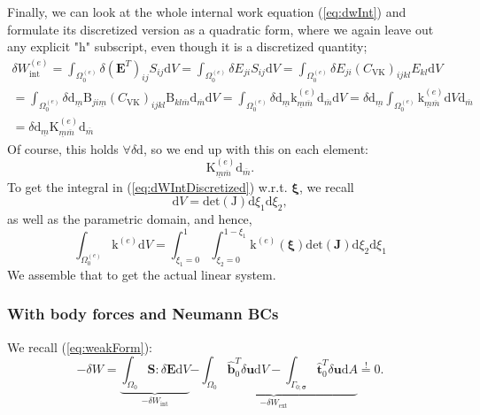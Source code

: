\documentclass[12pt,a4paper]{article}
\theoremstyle{remark} %
\newcommand{\bu}[1]{\bm{\mathrm #1}} %
\numberwithin{equation}{section} %
\begin{document}
Finally, we can look at the whole internal work equation (\ref{eq:dwInt}) and formulate its discretized version as a quadratic form, where we again leave out any explicit "h" subscript, even though it is a discretized quantity;
\begin{align} \label{eq:dWIntDiscretized}
	\delta W_{\text{int}}^{(e)} = \int_{\Omega_0^{(e)}} \delta (\bm E^T)_{ij} S_{ij} \mathrm d V
	= \int_{\Omega_0^{(e)}} \delta E_{ji} S_{ij} \mathrm d V
	= \int_{\Omega_0^{(e)}} \delta E_{ji} (C_{\text{VK}})_{ijkl} E_{kl} \mathrm d V \nonumber \\
	= \int_{\Omega_0^{(e)}} \delta \mathrm d_{\underline m} \mathrm B_{ji \underline m} (C_{\text{VK}})_{ijkl} \mathrm B_{kl \overline m} \mathrm d_{\overline m} \mathrm d V
	= \int_{\Omega_0^{(e)}} \delta \mathrm d_{\underline m} \mathrm k^{(e)}_{\underline m \overline m} \mathrm d_{\overline m} \mathrm d V
	= \delta \mathrm d_{\underline m} \int_{\Omega_0^{(e)}} \mathrm k^{(e)}_{\underline m \overline m} \mathrm d V \mathrm d_{\overline m} \nonumber \\
	= \delta \mathrm d_{\underline m} \mathrm K^{(e)}_{\underline m \overline m} \mathrm d_{\overline m}
\end{align}
Of course, this holds $\forall \delta \bu d$, so we end up with this on each element:
\begin{equation}
	\mathrm K^{(e)}_{\underline m \overline m} \mathrm d_{\overline m} .
\end{equation}
To get the integral in (\ref{eq:dWIntDiscretized}) w.r.t. $\bm \xi$, we recall
\begin{equation}
	\mathrm d V = \text{det}(\bu J) \mathrm d \xi_1 \mathrm d \xi_2 ,
\end{equation}
as well as the parametric domain, and hence,
\begin{equation}
	\int_{\Omega_0^{(e)}} \bu k^{(e)} \mathrm d V
	= \int_{\xi_1=0}^{1} \int_{\xi_2=0}^{1-\xi_1} \bu k^{(e)}(\bm \xi) \text{det}(\bm J) \mathrm d \xi_2 \mathrm d \xi_1
\end{equation}
%
We assemble that to get the actual linear system.

\subsubsection{With body forces and Neumann BCs}
We recall (\ref{eq:weakForm}):
\begin{equation}
	-\delta W = \underbrace{\int_{\Omega_0} \bm S : \delta \bm E \mathrm d V}_{-\delta W_{\text{int}}} \underbrace{- \int_{\Omega_0} \hat{\bm b}_0^T \delta \bm u \mathrm d V - \int_{\Gamma_{0; \bm \sigma}} \hat{\bm t}_0^T \delta \bm u \mathrm d A}_{-\delta W_{\text{ext}}} \overset{!}{=} 0 .
\end{equation}
%
\end{document}
